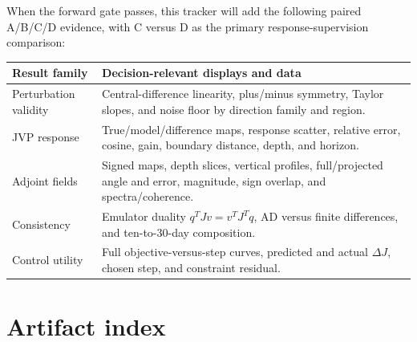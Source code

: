 \documentclass[11pt]{article}
\begin{document}
When the forward gate passes, this tracker will add the following paired A/B/C/D
evidence, with C versus D as the primary response-supervision comparison:

\begin{tabularx}{\textwidth}{@{}p{}Y@{}}
\toprule
\textbf{Result family} & \textbf{Decision-relevant displays and data} \\
\midrule
Perturbation validity & Central-difference linearity, plus/minus symmetry, Taylor slopes, and noise floor by direction family and region. \\
JVP response & True/model/difference maps, response scatter, relative error, cosine, gain, boundary distance, depth, and horizon. \\
Adjoint fields & Signed maps, depth slices, vertical profiles, full/projected angle and error, magnitude, sign overlap, and spectra/coherence. \\
Consistency & Emulator duality $q^T Jv=v^T J^Tq$, AD versus finite differences, and ten-to-30-day composition. \\
Control utility & Full objective-versus-step curves, predicted and actual $\Delta J$, chosen step, and constraint residual. \\
\bottomrule
\end{tabularx}

\section{Artifact index}
\end{document}
